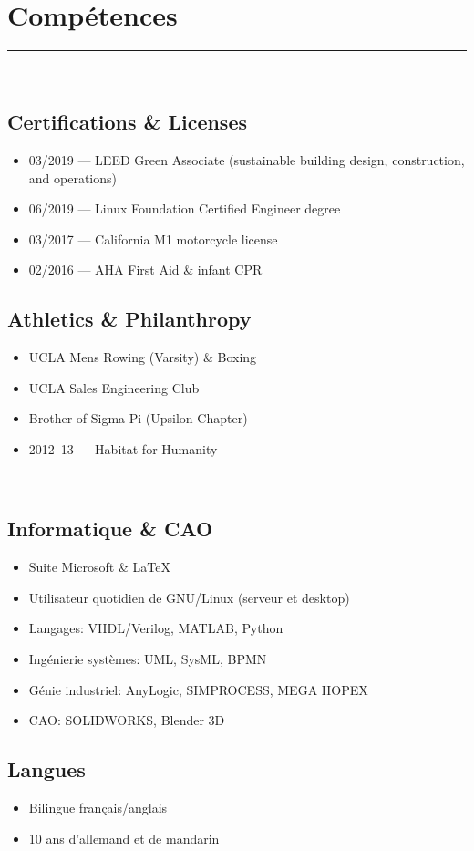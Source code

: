 \documentclass[10pt]{report}
\begin{document}
\section*{Compétences}
\rule{\linewidth}{1pt}\\[0.2cm]
\begin{minipage}[t]{0.48\linewidth}
    \subsection*{Certifications \& Licenses}
    \begin{itemize}
        \item 03/2019 --- LEED Green Associate (sustainable building design, construction, and operations)
        \item 06/2019 --- Linux Foundation Certified Engineer degree
        \item 03/2017 --- California M1 motorcycle license
        \item 02/2016 --- AHA First Aid \& infant CPR
    \end{itemize}
    \subsection*{Athletics \& Philanthropy}
    \begin{itemize}
        \item UCLA Mens Rowing (Varsity) \& Boxing
        \item UCLA Sales Engineering Club
        \item Brother of Sigma Pi (Upsilon Chapter)
        \item 2012--13 --- Habitat for Humanity
    \end{itemize}
\end{minipage}
~
\begin{minipage}[t]{0.48\linewidth}
    \subsection*{Informatique \& CAO}
    \begin{itemize}
        \item Suite Microsoft \& \LaTeX
        \item Utilisateur quotidien de GNU/Linux (serveur et desktop)
        \item Langages: VHDL/Verilog, MATLAB, Python
        \item Ingénierie systèmes: UML, SysML, BPMN
        \item Génie industriel: AnyLogic, SIMPROCESS, MEGA HOPEX
        \item CAO: SOLIDWORKS, Blender 3D
    \end{itemize}
    \subsection*{Langues}
    \begin{itemize}
        \item Bilingue français/anglais
        \item 10 ans d'allemand et de mandarin
    \end{itemize}
\end{minipage}
\end{document}
